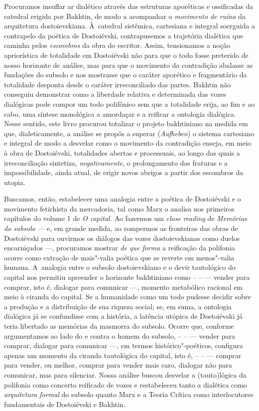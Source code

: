 Procuramos insuflar ar dialético através das estruturas aporéticas e
ossificadas da catedral erigida por Bakhtin, de modo a acompanhar o
\emph{movimento de ruína} da arquitetura dostoievskiana. À~catedral
sistêmica, cartesiana e integral soerguida a contrapelo da poética de
Dostoiévski, contrapusemos a trajetória dialética que caminha pelos
\emph{escombros} da obra do escritor. Assim, tensionamos a noção
apriorística de totalidade em Dostoiévski não para que o todo fosse
preterido de nosso horizonte de análise, mas para que o movimento da
contradição abalasse as fundações do subsolo e nos mostrasse que o
caráter aporético e fragmentário da totalidade desponta desde o caráter
irreconciliado das partes. Bakhtin não conseguiu demonstrar como a
liberdade relativa e determinada das vozes dialógicas pode compor um
todo polifônico sem que a totalidade erija, ao fim e ao cabo, uma
síntese monológica a amordaçar e a reificar a ontologia dialógica. Nesse
sentido, este livro procurou totalizar o projeto bakhtiniano na medida
em que, dialeticamente, a análise se propôs a superar (\emph{Aufheben})
o sistema cartesiano e integral de modo a desvelar como o movimento da
contradição enseja, em meio à obra de Dostoiévski, totalidades abertas e
processuais, ao longo das quais a irreconciliação sintetiza,
\emph{negativamente}, o prolongamento das fraturas e a impossibilidade,
ainda atual, de erigir novos abrigos a partir dos escombros da utopia.

Buscamos, então, estabelecer uma analogia entre a poética de Dostoiévski
e o movimento fetichista da mercadoria, tal como Marx o analisa nos
primeiros capítulos do volume 1 de \emph{O capital.} Ao fazermos um
\emph{close reading} de \emph{Memórias do subsolo} --- e, em grande
medida, ao rompermos as fronteiras das obras de Dostoiévski para
ouvirmos os diálogos das vozes dostoievskianas como duelos encarniçados
---, procuramos mostrar \emph{de que forma} a reificação da polifonia
ocorre como extração de mais"-valia poética que se reverte em menos"-valia
humana. A~analogia entre o subsolo dostoievskiano e o devir tautológico
do capital nos permitiu apreender o horizonte bakhtiniano como  --  --
 --- vender para comprar, isto é, dialogar para comunicar ---, momento
metabólico racional em meio à ciranda do capital. Se a humanidade como
um todo pudesse decidir sobre a produção e a distribuição de sua riqueza
social; se, em suma, a ontologia dialógica já se confundisse com a
história, a latência utópica de Dostoiévski já teria libertado as
memórias da masmorra do subsolo. Ocorre que, conforme argumentamos ao
lado do e contra o homem do subsolo,  --  --  --- vender para comprar,
dialogar para comunicar ---, em termos histórico"-poéticos, configura
apenas um momento da ciranda tautológica do capital, isto é,  --  --
 --- comprar para vender, ou melhor, comprar para vender mais caro,
dialogar não para comunicar, mas para silenciar. Nossa análise buscou
desvelar a (tauto)lógica da polifonia como concerto reificado de vozes e
restabeleceu tanto a dialética como \emph{arquitetura formal} do subsolo
quanto Marx e a Teoria Crítica como interlocutores fundamentais de
Dostoiévski e Bakhtin.

